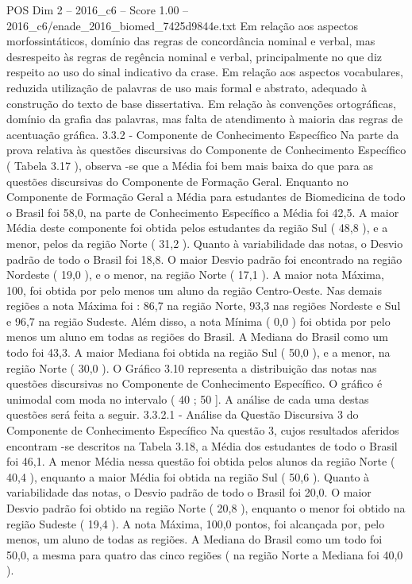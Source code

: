 \begin{textsample}{POS Dim 2 – 2016\_c6 – Score 1.00 – 2016\_c6/enade\_2016\_biomed\_7425d9844e.txt}
Em relação aos aspectos morfossintáticos, domínio das regras de concordância nominal e verbal, mas desrespeito às regras de regência nominal e verbal, principalmente no que diz respeito ao uso do sinal indicativo da crase.
Em relação aos aspectos vocabulares, reduzida utilização de palavras de uso mais formal e abstrato, adequado à construção do texto de base dissertativa.
Em relação às convenções ortográficas, domínio da grafia das palavras, mas falta de atendimento à maioria das regras de acentuação gráfica. 3.3.2 - Componente de Conhecimento Específico Na parte da prova relativa às questões discursivas do Componente de Conhecimento Específico ( Tabela 3.17 ), observa -se que a Média foi bem mais baixa do que para as questões discursivas do Componente de Formação Geral.
Enquanto no Componente de Formação Geral a Média para estudantes de Biomedicina de todo o Brasil foi 58,0, na parte de Conhecimento Específico a Média foi 42,5.
A maior Média deste componente foi obtida pelos estudantes da região Sul ( 48,8 ), e a menor, pelos da região Norte ( 31,2 ).
Quanto à variabilidade das notas, o Desvio padrão de todo o Brasil foi 18,8.
O maior Desvio padrão foi encontrado na região Nordeste ( 19,0 ), e o menor, na região Norte ( 17,1 ).
A maior nota Máxima, 100, foi obtida por pelo menos um aluno da região Centro-Oeste.
Nas demais regiões a nota Máxima foi : 86,7 na região Norte, 93,3 nas regiões Nordeste e Sul e 96,7 na região Sudeste.
Além disso, a nota Mínima ( 0,0 ) foi obtida por pelo menos um aluno em todas as regiões do Brasil.
A Mediana do Brasil como um todo foi 43,3.
A maior Mediana foi obtida na região Sul ( 50,0 ), e a menor, na região Norte ( 30,0 ).
O Gráfico 3.10 representa a distribuição das notas nas questões discursivas no Componente de Conhecimento Específico.
O gráfico é unimodal com moda no intervalo ( 40 ; 50 ].
A análise de cada uma destas questões será feita a seguir. 3.3.2.1 - Análise da Questão Discursiva 3 do Componente de Conhecimento Específico Na questão 3, cujos resultados aferidos encontram -se descritos na Tabela 3.18, a Média dos estudantes de todo o Brasil foi 46,1.
A menor Média nessa questão foi obtida pelos alunos da região Norte ( 40,4 ), enquanto a maior Média foi obtida na região Sul ( 50,6 ).
Quanto à variabilidade das notas, o Desvio padrão de todo o Brasil foi 20,0.
O maior Desvio padrão foi obtido na região Norte ( 20,8 ), enquanto o menor foi obtido na região Sudeste ( 19,4 ).
A nota Máxima, 100,0 pontos, foi alcançada por, pelo menos, um aluno de todas as regiões.
A Mediana do Brasil como um todo foi 50,0, a mesma para quatro das cinco regiões ( na região Norte a Mediana foi 40,0 ).

\end{textsample}
